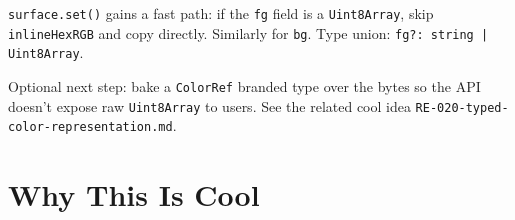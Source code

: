\texttt{s\allowbreak{}u\allowbreak{}r\allowbreak{}f\allowbreak{}a\allowbreak{}c\allowbreak{}e\allowbreak{}.\allowbreak{}s\allowbreak{}e\allowbreak{}t\allowbreak{}(\allowbreak{})} gains a fast path: if the \texttt{f\allowbreak{}g} field is a \texttt{U\allowbreak{}i\allowbreak{}n\allowbreak{}t\allowbreak{}8\allowbreak{}A\allowbreak{}r\allowbreak{}r\allowbreak{}a\allowbreak{}y}, skip \texttt{i\allowbreak{}n\allowbreak{}l\allowbreak{}i\allowbreak{}n\allowbreak{}e\allowbreak{}H\allowbreak{}e\allowbreak{}x\allowbreak{}R\allowbreak{}G\allowbreak{}B} and copy directly. Similarly for \texttt{b\allowbreak{}g}. Type union: \texttt{f\allowbreak{}g\allowbreak{}?\allowbreak{}:\allowbreak{} \allowbreak{}s\allowbreak{}t\allowbreak{}r\allowbreak{}i\allowbreak{}n\allowbreak{}g\allowbreak{} \allowbreak{}|\allowbreak{} \allowbreak{}U\allowbreak{}i\allowbreak{}n\allowbreak{}t\allowbreak{}8\allowbreak{}A\allowbreak{}r\allowbreak{}r\allowbreak{}a\allowbreak{}y}.

Optional next step: bake a \texttt{C\allowbreak{}o\allowbreak{}l\allowbreak{}o\allowbreak{}r\allowbreak{}R\allowbreak{}e\allowbreak{}f} branded type over the bytes so the API doesn't expose raw \texttt{U\allowbreak{}i\allowbreak{}n\allowbreak{}t\allowbreak{}8\allowbreak{}A\allowbreak{}r\allowbreak{}r\allowbreak{}a\allowbreak{}y} to users. See the related cool idea \texttt{R\allowbreak{}E\allowbreak{}-\allowbreak{}0\allowbreak{}2\allowbreak{}0\allowbreak{}-\allowbreak{}t\allowbreak{}y\allowbreak{}p\allowbreak{}e\allowbreak{}d\allowbreak{}-\allowbreak{}c\allowbreak{}o\allowbreak{}l\allowbreak{}o\allowbreak{}r\allowbreak{}-\allowbreak{}r\allowbreak{}e\allowbreak{}p\allowbreak{}r\allowbreak{}e\allowbreak{}s\allowbreak{}e\allowbreak{}n\allowbreak{}t\allowbreak{}a\allowbreak{}t\allowbreak{}i\allowbreak{}o\allowbreak{}n\allowbreak{}.\allowbreak{}m\allowbreak{}d}.

\section{Why This Is Cool}\label{record-369-why-this-is-cool}

